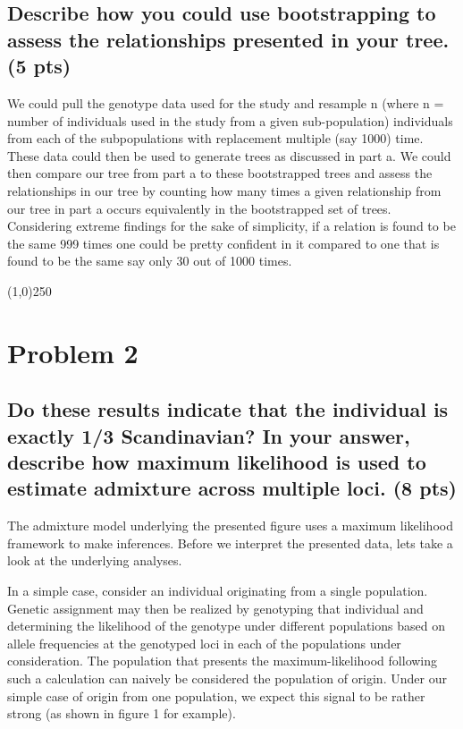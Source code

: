 \documentclass[]{article}
\begin{document}
\subsection{Describe how you could use bootstrapping to assess the
relationships presented in your tree. (5
pts)}\label{describe-how-you-could-use-bootstrapping-to-assess-the-relationships-presented-in-your-tree.-5-pts}

We could pull the genotype data used for the study and resample n (where
n = number of individuals used in the study from a given sub-population)
individuals from each of the subpopulations with replacement multiple
(say 1000) time. These data could then be used to generate trees as
discussed in part a. We could then compare our tree from part a to these
bootstrapped trees and assess the relationships in our tree by counting
how many times a given relationship from our tree in part a occurs
equivalently in the bootstrapped set of trees. Considering extreme
findings for the sake of simplicity, if a relation is found to be the
same 999 times one could be pretty confident in it compared to one that
is found to be the same say only 30 out of 1000 times.

\begin{center}
\line(1,0){250}
\end{center}

\pagebreak

\section{Problem 2}\label{problem-2}


\subsection{Do these results indicate that the individual is exactly 1/3
Scandinavian? In your answer, describe how maximum likelihood is used to
estimate admixture across multiple loci. (8
pts)}\label{do-these-results-indicate-that-the-individual-is-exactly-13-scandinavian-in-your-answer-describe-how-maximum-likelihood-is-used-to-estimate-admixture-across-multiple-loci.-8-pts}

The admixture model underlying the presented figure uses a maximum
likelihood framework to make inferences. Before we interpret the
presented data, lets take a look at the underlying analyses.

In a simple case, consider an individual originating from a single
population. Genetic assignment may then be realized by genotyping that
individual and determining the likelihood of the genotype under
different populations based on allele frequencies at the genotyped loci
in each of the populations under consideration. The population that
presents the maximum-likelihood following such a calculation can naively
be considered the population of origin. Under our simple case of origin
from one population, we expect this signal to be rather strong (as shown
in figure 1 for example).
\end{document}
